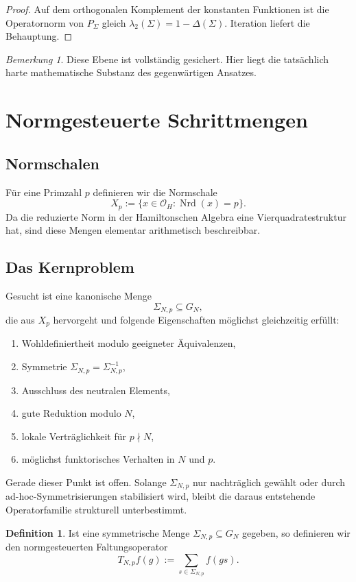 \documentclass[12pt,a4paper]{article}
\theoremstyle{plain}
\theoremstyle{definition}
\newtheorem{definition}[satz]{Definition}
\theoremstyle{remark}
\newtheorem{bemerkung}[satz]{Bemerkung}
\newcommand{\OH}{\mathcal{O}_H}
\newcommand{\Nrd}{\operatorname{Nrd}}
\begin{document}
	\begin{proof}
		Auf dem orthogonalen Komplement der konstanten Funktionen ist die Operatornorm von $P_\Sigma$ gleich $\lambda_2(\Sigma)=1-\Delta(\Sigma)$. Iteration liefert die Behauptung.
	\end{proof}
	
	\begin{bemerkung}
		Diese Ebene ist vollständig gesichert. Hier liegt die tatsächlich harte mathematische Substanz des gegenwärtigen Ansatzes.
	\end{bemerkung}
	
	\section{Normgesteuerte Schrittmengen}
	\subsection{Normschalen}
	Für eine Primzahl $p$ definieren wir die Normschale
	\[
	X_p:=\{x\in \OH\colon \Nrd(x)=p\}.
	\]
	Da die reduzierte Norm in der Hamiltonschen Algebra eine Vierquadratestruktur hat, sind diese Mengen elementar arithmetisch beschreibbar.
	
	\subsection{Das Kernproblem}
	Gesucht ist eine kanonische Menge
	\[
	\Sigma_{N,p}\subseteq G_N,
	\]
	die aus $X_p$ hervorgeht und folgende Eigenschaften möglichst gleichzeitig erfüllt:
	\begin{enumerate}[label=(\roman*)]
		\item Wohldefiniertheit modulo geeigneter Äquivalenzen,
		\item Symmetrie $\Sigma_{N,p}=\Sigma_{N,p}^{-1}$,
		\item Ausschluss des neutralen Elements,
		\item gute Reduktion modulo $N$,
		\item lokale Verträglichkeit für $p\nmid N$,
		\item möglichst funktorisches Verhalten in $N$ und $p$.
	\end{enumerate}
	
	Gerade dieser Punkt ist offen. Solange $\Sigma_{N,p}$ nur nachträglich gewählt oder durch ad-hoc-Symmetrisierungen stabilisiert wird, bleibt die daraus entstehende Operatorfamilie strukturell unterbestimmt.
	
	\begin{definition}
		Ist eine symmetrische Menge $\Sigma_{N,p}\subseteq G_N$ gegeben, so definieren wir den normgesteuerten Faltungsoperator
		\[
		T_{N,p}f(g):=\sum_{s\in \Sigma_{N,p}} f(gs).
		\]
	\end{definition}
	
\end{document}
